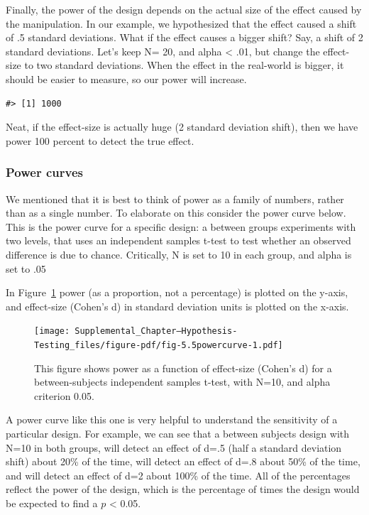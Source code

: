 \documentclass[
  letterpaper,
  DIV=11,
  numbers=noendperiod]{scrartcl}
\begin{document}
Finally, the power of the design depends on the actual size of the
effect caused by the manipulation. In our example, we hypothesized that
the effect caused a shift of .5 standard deviations. What if the effect
causes a bigger shift? Say, a shift of 2 standard deviations. Let's keep
N= 20, and alpha \textless{} .01, but change the effect-size to two
standard deviations. When the effect in the real-world is bigger, it
should be easier to measure, so our power will increase.

\begin{verbatim}
#> [1] 1000
\end{verbatim}

Neat, if the effect-size is actually huge (2 standard deviation shift),
then we have power 100 percent to detect the true effect.

\hypertarget{power-curves}{%
\subsubsection{Power curves}\label{power-curves}}

We mentioned that it is best to think of power as a family of numbers,
rather than as a single number. To elaborate on this consider the power
curve below. This is the power curve for a specific design: a between
groups experiments with two levels, that uses an independent samples
t-test to test whether an observed difference is due to chance.
Critically, N is set to 10 in each group, and alpha is set to .05

In Figure~\ref{fig-5.5powercurve} power (as a proportion, not a
percentage) is plotted on the y-axis, and effect-size (Cohen's d) in
standard deviation units is plotted on the x-axis.

\begin{figure}

{\centering \texttt{[image: Supplemental\_Chapter---Hypothesis-Testing\_files/figure-pdf/fig-5.5powercurve-1.pdf]}

}

\caption{\label{fig-5.5powercurve}This figure shows power as a function
of effect-size (Cohen's d) for a between-subjects independent samples
t-test, with N=10, and alpha criterion 0.05.}

\end{figure}

A power curve like this one is very helpful to understand the
sensitivity of a particular design. For example, we can see that a
between subjects design with N=10 in both groups, will detect an effect
of d=.5 (half a standard deviation shift) about 20\% of the time, will
detect an effect of d=.8 about 50\% of the time, and will detect an
effect of d=2 about 100\% of the time. All of the percentages reflect
the power of the design, which is the percentage of times the design
would be expected to find a \(p\) \textless{} 0.05.
\end{document}
